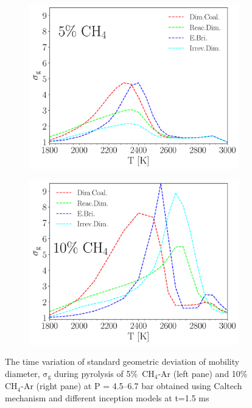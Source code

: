 \begin{figure}[H]
	\centering
	\begin{subfigure}[t]{0.4\textwidth}
		\includegraphics[width=1\textwidth]{Figures/Results/Shocktube/Agafonov2016/5CH4/sigma.pdf}
	\end{subfigure}
	\begin{subfigure}[t]{0.4\textwidth}
		\includegraphics[width=1\textwidth]{Figures/Results/Shocktube/Agafonov2016/10CH4/sigma.pdf}
	\end{subfigure}
	\caption{The time variation of standard geometric deviation of mobility diameter, $\mathrm{\sigma_{g}}$ during pyrolysis of 5\%~$\mathrm{CH_4}$-Ar (left pane) and 10\%~$\mathrm{CH_4}$-Ar (right pane) at $\mathrm{P}$ = 4.5–6.7 bar obtained using Caltech mechanism and different inception models at t=1.5 ms}
\label{fig:shocktubesigma} 
\end{figure}

